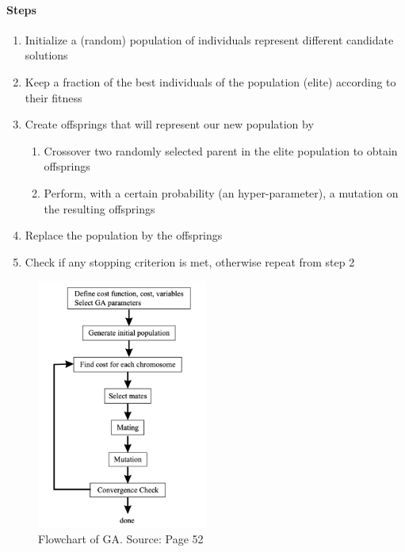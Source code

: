    \paragraph{Steps}

        \begin{enumerate}
            \item Initialize a (random) population of individuals represent different candidate solutions
            \item Keep a fraction of the best individuals of the population (elite) according to their fitness
            \item Create offsprings that will represent our new population by
            \begin{enumerate}
                \item Crossover two randomly selected parent in the elite population to obtain offsprings
                \item Perform, with a certain probability (an hyper-parameter), a mutation on the resulting offsprings
            \end{enumerate}
            \item Replace the population by the offsprings 
            \item Check if any stopping criterion is met, otherwise repeat from step 2
        \end{enumerate}

        \begin{figure}[H]
            \centering
            \includegraphics[width=0.5\textwidth]{img/contiGA.png}
            \caption{Flowchart of GA. Source: \cite{contiGA} Page 52}
        \end{figure}
    

